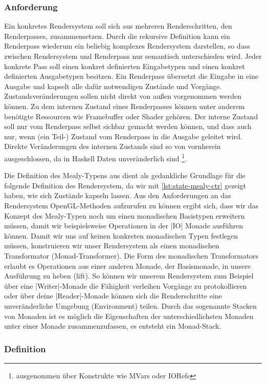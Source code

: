\subsubsection{Anforderung}
Ein konkretes Rendersystem soll sich aus mehreren  Renderschritten, den Renderpasses, zusammensetzen. Durch die rekursive Definition kann ein Renderpass wiederum ein beliebig komplexes Rendersystem darstellen, so dass zwischen Rendersystem und Renderpass nur semantisch unterschieden wird. Jeder konkrete Pass soll einen konkret definierten Eingabetypen und einen konkret definierten Ausgabetypen besitzen. Ein Renderpass übersetzt die Eingabe in eine Ausgabe und kapselt alle dafür notwendigen Zustände und Vorgänge. Zustandsveränderungen sollen nicht direkt von außen vorgenommen werden können. Zu dem internen Zustand eines Renderpasses können unter anderem benötigte Ressourcen wie Framebuffer oder Shader gehören. Der interne Zustand soll nur vom Renderpass selbst sichbar gemacht werden können, und dass auch nur, wenn (ein Teil-) Zustand vom Renderpass in die Ausgabe geleitet wird. Direkte Veränderungen des internen Zustands sind so von vornherein ausgeschlossen, da in Haskell Daten unveränderlich sind \footnote{ausgenommen über Konstrukte wie MVars oder IORefs}.

Die Definition des Mealy-Typens aus  dient als gedankliche Grundlage für die folgende Definition des Rendersystem, da wir mit \ref{lst:state-mealy-ctr} gezeigt haben, wie sich Zustände kapseln lassen. Aus den Anforderungen an das Rendersystem OpenGL-Methoden aufzurufen zu können ergibt sich, dass wir das Konzept des Mealy-Typen noch um einen monadischen Basistypen erweitern müssen, damit wir beispielsweise Operationen in der |IO| Monade ausführen können. Damit wir uns auf keinen konkreten monadischen Typen festlegen müssen, konstruieren wir unser Rendersystem als einen monadischen Transformator (Monad-Transformer). Die Form des monadischen Transformators erlaubt es Operationen aus einer anderen Monade, der Basismonade, in unsere Ausführung zu heben (lift). So können wir unserem Rendersystem zum Beispiel über eine |Writer|-Monade die Fähigkeit verleihen Vorgänge zu protokollieren oder über deine |Reader|-Monade können sich die Renderschritte eine unveränderliche Umgebung (Environment) teilen. Durch das sogenannte Stacken von Monaden ist es möglich die Eigenschaften der unterschiedlichsten Monaden unter einer Monade zusammenzufassen, es entsteht ein Monad-Stack.

\subsubsection{Definition}

